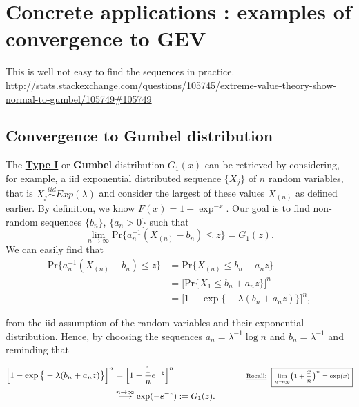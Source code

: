 \documentclass[11pt,a4paper,openany ]{book}
\begin{document}
\section{Concrete applications : examples of convergence to GEV}\label{sec::appconcrete}

This is well not easy to find the sequences in practice.
\url{http://stats.stackexchange.com/questions/105745/extreme-value-theory-show-normal-to-gumbel/105749#105749}

\subsection*{Convergence to Gumbel distribution}
The \textbf{\underline{Type I}} or \textbf{Gumbel} distribution $G_1(x)$ can be retrieved by considering, for example,  a iid exponential distributed sequence $\{X_j\}$ of $n$ random variables, that is $X_j\stackrel{iid}{\sim}Exp(\lambda)$ and consider the largest of these values $X_{(n)}$ as defined earlier. By definition, we know $F(x)=1-\exp^{-x}$. Our goal is to find non-random sequences $\{b_n\}$, $\{a_n>0\}$ such that 
\begin{equation}
\displaystyle{\lim_{n \to \infty}}\text{Pr}\big\{ a_n^{-1}(X_{(n)}-b_n)\leq z\big\}=G_1(z).
\end{equation}
We can easily find that
\begin{equation*}
\begin{aligned}
\text{Pr}\big\{ a_n^{-1}(X_{(n)}-b_n)\leq z\big\}
&=\text{Pr}\{X_{(n)}\leq b_n+a_nz\} \\ &=\Big[\text{Pr}\{X_1\leq b_n+a_nz\}\Big]^n \\
&=\Big[1-\exp\big\{-\lambda(b_n+a_nz)\big\}\Big]^n,
\end{aligned}
\end{equation*}

from the iid assumption of the random variables and their exponential distribution.
Hence, by choosing  the sequences $a_n=\lambda^{-1}\log n$ and $b_n=\lambda^{-1}$ and reminding that%


\begin{equation*}
\begin{aligned}
\Big[1-\exp\big\{-\lambda(b_n+a_nz)\big\}\Big]^n 
& = \Big[1-\frac{1}{n}e^{-z}\Big]^n \ \ \ \ \ \ \ \ \ \ \ \ \ \ \ \ \ \ \ \ \ \ \ \ \ \scriptsize\text{\underline{Recall:}} \ \ %
\boxed{\scriptsize\displaystyle{\lim_{n \to \infty}}\Big(1+\frac{x}{n}\Big)^n=\exp(x)} \\
& \stackrel{n\to\infty}{\longrightarrow} \exp(-e^{-z}):=G_1(z).
\end{aligned}
\end{equation*}
\end{document}
